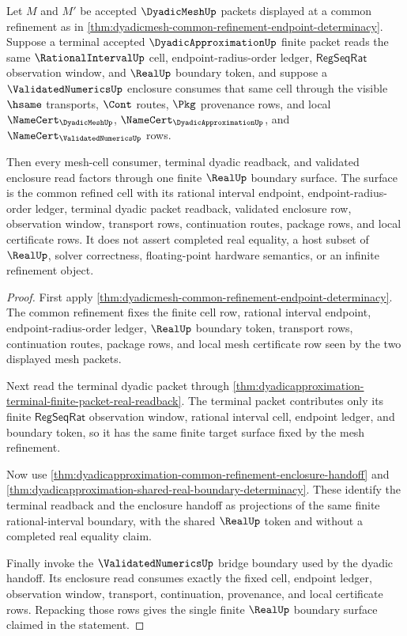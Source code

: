 \begin{theorem}
\label{thm:dyadicmesh-validated-terminal-readback-determinacy}
Let $M$ and $M'$ be accepted $\DyadicMeshUp$ packets displayed at a common
refinement as in
\autoref{thm:dyadicmesh-common-refinement-endpoint-determinacy}. Suppose a
terminal accepted $\DyadicApproximationUp$ finite packet reads the same
$\RationalIntervalUp$ cell, endpoint-radius-order ledger,
$\mathsf{RegSeqRat}$ observation window, and $\RealUp$ boundary token, and
suppose a $\ValidatedNumericsUp$ enclosure consumes that same cell through the
visible $\hsame$ transports, $\Cont$ routes, $\Pkg$ provenance rows, and local
$\NameCert_{\DyadicMeshUp}$, $\NameCert_{\DyadicApproximationUp}$, and
$\NameCert_{\ValidatedNumericsUp}$ rows.

Then every mesh-cell consumer, terminal dyadic readback, and validated
enclosure read factors through one finite $\RealUp$ boundary surface. The
surface is the common refined cell with its rational interval endpoint,
endpoint-radius-order ledger, terminal dyadic packet readback, validated
enclosure row, observation window, transport rows, continuation routes,
package rows, and local certificate rows. It does not assert completed real
equality, a host subset of $\RealUp$, solver correctness, floating-point
hardware semantics, or an infinite refinement object.
\end{theorem}
\begin{proof}
First apply
\autoref{thm:dyadicmesh-common-refinement-endpoint-determinacy}. The common
refinement fixes the finite cell row, rational interval endpoint,
endpoint-radius-order ledger, $\RealUp$ boundary token, transport rows,
continuation routes, package rows, and local mesh certificate row seen by the
two displayed mesh packets.

Next read the terminal dyadic packet through
\autoref{thm:dyadicapproximation-terminal-finite-packet-real-readback}. The
terminal packet contributes only its finite $\mathsf{RegSeqRat}$ observation
window, rational interval cell, endpoint ledger, and boundary token, so it has
the same finite target surface fixed by the mesh refinement.

Now use
\autoref{thm:dyadicapproximation-common-refinement-enclosure-handoff} and
\autoref{thm:dyadicapproximation-shared-real-boundary-determinacy}. These
identify the terminal readback and the enclosure handoff as projections of the
same finite rational-interval boundary, with the shared $\RealUp$ token and
without a completed real equality claim.

Finally invoke the $\ValidatedNumericsUp$ bridge boundary used by the dyadic
handoff. Its enclosure read consumes exactly the fixed cell, endpoint ledger,
observation window, transport, continuation, provenance, and local certificate
rows. Repacking those rows gives the single finite $\RealUp$ boundary surface
claimed in the statement.
\end{proof}

